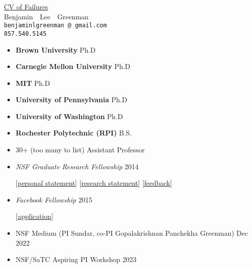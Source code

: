 \documentclass{article}
\makeatletter
\renewcommand{\maketitle}{
\begin{center}
  {\large{\href{https://www.princeton.edu/~joha/Johannes\_Haushofer\_CV\_of\_Failures.pdf}{CV of Failures}} \\
   \large{Benjamin~~Lee~~Greenman}}
\\\texttt{benjaminlgreenman\,@\,gmail.com}
\\\texttt{857.540.5145}
\end{center}
}
\makeatother
\begin{document}
\maketitle

{\centering{}}



\begin{itemize}
\item {\bf Brown University} \hfill Ph.D
\item {\bf Carnegie Mellon University} \hfill Ph.D
\item {\bf MIT} \hfill Ph.D
\item {\bf University of Pennsylvania} \hfill Ph.D
\item {\bf University of Washington} \hfill Ph.D
\item {\bf Rochester Polytechnic (RPI)} \hfill B.S.
\end{itemize}


\begin{itemize}
  \item 30+ (too many to list)  \hfill Assistant Professor
\end{itemize}


\begin{itemize}
\item \emph{NSF Graduate Research Fellowship} \hfill 2014
\item[] [\href{https://cs.brown.edu/~bgreenma/cv/failures/nsf-2014-personal-reject.pdf}{personal statement}]
        [\href{https://cs.brown.edu/~bgreenma/cv/failures/nsf-2014-research-reject.pdf}{research statement}]
        [\href{https://cs.brown.edu/~bgreenma/cv/failures/nsf-2014-reject-response.pdf}{feedback}]
\item \emph{Facebook Fellowship} \hfill 2015
\item[] [\href{http://ccs.neu.edu/home/types/cv/failures/facebook-2015-reject.pdf}{application}]
\item NSF Medium (PI Sundar, co-PI Gopalakrishnan Panchekha Greenman) \hfill Dec 2022
\item NSF/SaTC Aspiring PI Workshop \hfill 2023
\end{itemize}
\end{document}
